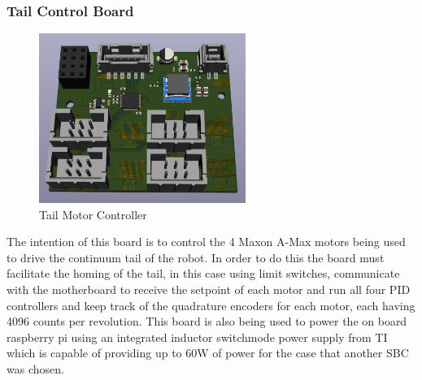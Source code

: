 \subsubsection{Tail Control Board}
\begin{figure}[H]
       \centering
       \includegraphics[width=0.6\textwidth]{figures/TailControllerBoard.png}
       \caption{Tail Motor Controller}
       \label{fig:TailControlBoardPCB}
   \end{figure}
   The intention of this board is to control the 4 Maxon A-Max motors being used to drive the continuum tail of the robot. In order to do this the board must facilitate the homing of the tail, in this case using limit switches, communicate with the motherboard to receive the setpoint of each motor and run all four PID controllers and keep track of the quadrature encoders for each motor, each having 4096 counts per revolution. This board is also being used to power the on board raspberry pi using an integrated inductor switchmode power supply from TI which is capable of providing up to 60W of power for the case that another SBC was chosen. 
   

